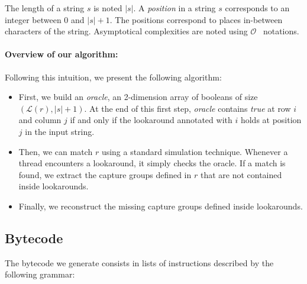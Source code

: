 \documentclass{article}
\def\size#1{\ensuremath{|#1|}}
\def\looknb#1{\ensuremath{\mathcal{L}(#1)}}
\def\bigo{\ensuremath{\mathcal{O}}}
\begin{document}
The length of a string $s$ is noted \size{s}.
A \textit{position} in a string $s$ corresponds to an integer between 0 and $\size{s}+1$.
The positions correspond to places in-between characters of the string.
Asymptotical complexities are noted using \bigo~ notations.



\paragraph{Overview of our algorithm:}

Following this intuition, we present the following algorithm:

\begin{itemize}
\item First, we build an \textit{oracle}, an 2-dimension array of booleans of size $(\looknb{r}, \size{s}+1)$.
  At the end of this first step, \textit{oracle} contains \textit{true} at row $i$ and column $j$ if and only if the lookaround annotated with $i$ holds at position $j$ in the input string.
\item Then, we can match $r$ using a standard simulation technique. Whenever a thread encounters a lookaround, it simply checks the oracle. If a match is found, we extract the capture groups defined in $r$ that are not contained inside lookarounds.
\item Finally, we reconstruct the missing capture groups defined inside lookarounds.
\end{itemize}

  
\subsection{Bytecode}

The bytecode we generate consists in lists of instructions described by the following grammar:

\def\instr{\ensuremath{\mathit{e}}}
\def\lbl{\ensuremath{\mathit{l}}}
\def\reg{\ensuremath{\mathit{reg}}}
\def\lid{\ensuremath{\mathit{lid}}}
\end{document}

